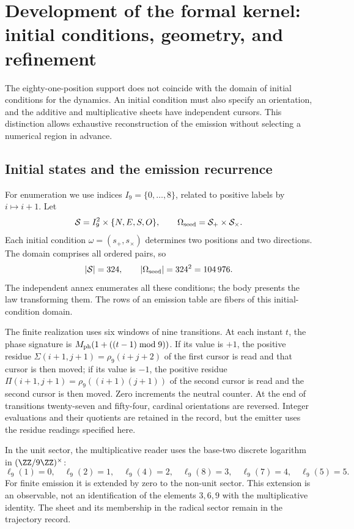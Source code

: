 \section{Development of the formal kernel: initial conditions, geometry, and refinement}
\label{sec:extension}

The eighty-one-position support does not coincide with the domain of initial conditions for the dynamics. An initial condition must also specify an orientation, and the additive and multiplicative sheets have independent cursors. This distinction allows exhaustive reconstruction of the emission without selecting a numerical region in advance.

\subsection{Initial states and the emission recurrence}

For enumeration we use indices \(I_9=\{0,\ldots,8\}\), related to positive labels by \(i\mapsto i+1\). Let
\[
 \mathcal S=I_9^2\times\{N,E,S,O\},\qquad
 \Omega_{\rm seed}=\mathcal S_+\times\mathcal S_\times.
\]
Each initial condition \(\omega=(s_+,s_\times)\) determines two positions and two directions. The domain comprises all ordered pairs, so
\begin{equation}
 |\mathcal S|=324,\qquad |\Omega_{\rm seed}|=324^2=104\,976.
 \label{eq:semillas}
\end{equation}
The independent annex enumerates all these conditions; the body presents the law transforming them. The rows of an emission table are fibers of this initial-condition domain.

The finite realization uses six windows of nine transitions. At each instant \(t\), the phase signature is \(M_{\rm ph}(1+((t-1)\bmod9))\). If its value is \(+1\), the positive residue \(\Sigma(i+1,j+1)=\rho_9(i+j+2)\) of the first cursor is read and that cursor is then moved; if its value is \(-1\), the positive residue \(\Pi(i+1,j+1)=\rho_9((i+1)(j+1))\) of the second cursor is read and the second cursor is then moved. Zero increments the neutral counter. At the end of transitions twenty-seven and fifty-four, cardinal orientations are reversed. Integer evaluations and their quotients are retained in the record, but the emitter uses the residue readings specified here.

In the unit sector, the multiplicative reader uses the base-two discrete logarithm in \((\ZZ/9\ZZ)^\times\):
\[
 \ell_9(1)=0,\quad\ell_9(2)=1,\quad\ell_9(4)=2,\quad
 \ell_9(8)=3,\quad\ell_9(7)=4,\quad\ell_9(5)=5.
\]
For finite emission it is extended by zero to the non-unit sector. This extension is an observable, not an identification of the elements \(3,6,9\) with the multiplicative identity. The sheet and its membership in the radical sector remain in the trajectory record.

